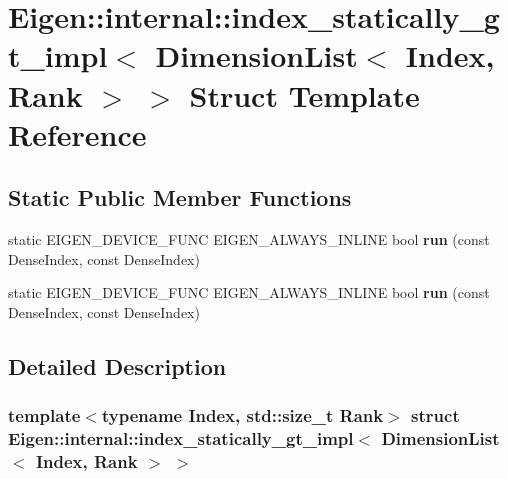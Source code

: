 \hypertarget{struct_eigen_1_1internal_1_1index__statically__gt__impl_3_01_dimension_list_3_01_index_00_01_rank_01_4_01_4}{}\section{Eigen\+:\+:internal\+:\+:index\+\_\+statically\+\_\+gt\+\_\+impl$<$ Dimension\+List$<$ Index, Rank $>$ $>$ Struct Template Reference}
\label{struct_eigen_1_1internal_1_1index__statically__gt__impl_3_01_dimension_list_3_01_index_00_01_rank_01_4_01_4}
\subsection*{Static Public Member Functions}
\begin{DoxyCompactItemize}
\item 
\mbox{\label{struct_eigen_1_1internal_1_1index__statically__gt__impl_3_01_dimension_list_3_01_index_00_01_rank_01_4_01_4_a566f194cfee0e807d4e98124b017be18}} 
static E\+I\+G\+E\+N\+\_\+\+D\+E\+V\+I\+C\+E\+\_\+\+F\+U\+NC E\+I\+G\+E\+N\+\_\+\+A\+L\+W\+A\+Y\+S\+\_\+\+I\+N\+L\+I\+NE bool {\bfseries run} (const Dense\+Index, const Dense\+Index)
\item 
\mbox{\label{struct_eigen_1_1internal_1_1index__statically__gt__impl_3_01_dimension_list_3_01_index_00_01_rank_01_4_01_4_a566f194cfee0e807d4e98124b017be18}} 
static E\+I\+G\+E\+N\+\_\+\+D\+E\+V\+I\+C\+E\+\_\+\+F\+U\+NC E\+I\+G\+E\+N\+\_\+\+A\+L\+W\+A\+Y\+S\+\_\+\+I\+N\+L\+I\+NE bool {\bfseries run} (const Dense\+Index, const Dense\+Index)
\end{DoxyCompactItemize}


\subsection{Detailed Description}
\subsubsection*{template$<$typename Index, std\+::size\+\_\+t Rank$>$\newline
struct Eigen\+::internal\+::index\+\_\+statically\+\_\+gt\+\_\+impl$<$ Dimension\+List$<$ Index, Rank $>$ $>$}



